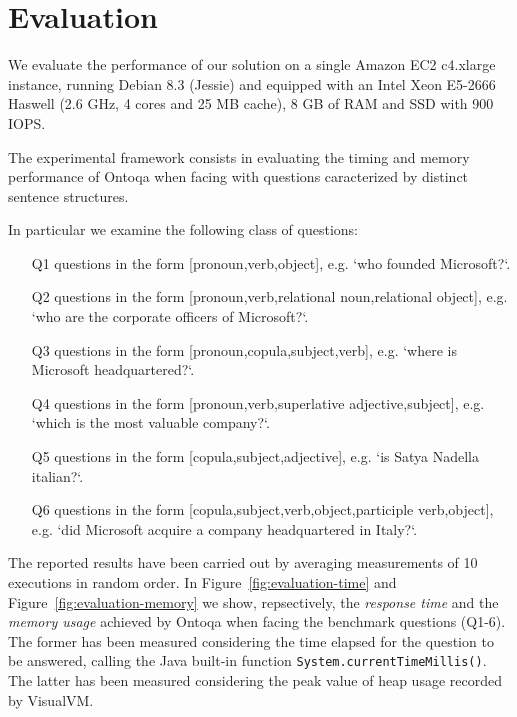 \section{Evaluation}
\label{sec:evaluation}
We evaluate the performance of our solution on a single
Amazon EC2 c4.xlarge instance, running Debian 8.3 (Jessie)
and equipped with an Intel Xeon E5-2666 Haswell (2.6 GHz,
4 cores and 25 MB cache), 8 GB of RAM and SSD with 900
IOPS.

The experimental framework consists in evaluating the timing and memory performance of Ontoqa when facing with questions caracterized by distinct sentence structures.

In particular we examine the following class of questions:

\begin{itemize}
	\item[Q1] questions in the form [pronoun,verb,object], e.g. `who founded Microsoft?`.
	\item[Q2] questions in the form [pronoun,verb,relational noun,relational object], e.g. `who are the corporate officers of Microsoft?`.
	\item[Q3] questions in the form [pronoun,copula,subject,verb], e.g. `where is Microsoft headquartered?`.
	\item[Q4] questions in the form [pronoun,verb,superlative adjective,subject], e.g. `which is the most valuable company?`.
	\item[Q5] questions in the form [copula,subject,adjective], e.g. `is Satya Nadella italian?`.
	\item[Q6] questions in the form [copula,subject,verb,object,participle verb,object], e.g. `did Microsoft acquire a company headquartered in Italy?`.
\end{itemize}

The reported results have been carried out by averaging measurements of 10 executions in random order. 
%
In Figure~\ref{fig:evaluation-time} and Figure~\ref{fig:evaluation-memory} we show, repsectively, the \textit{response time} and the \textit{memory usage} achieved by Ontoqa when facing the benchmark questions (Q1-6).
%
The former has been measured considering the time elapsed for the question to be answered, calling the Java built-in function \texttt{System.currentTimeMillis()}.
%
The latter has been measured considering the peak value of heap usage recorded by VisualVM.


